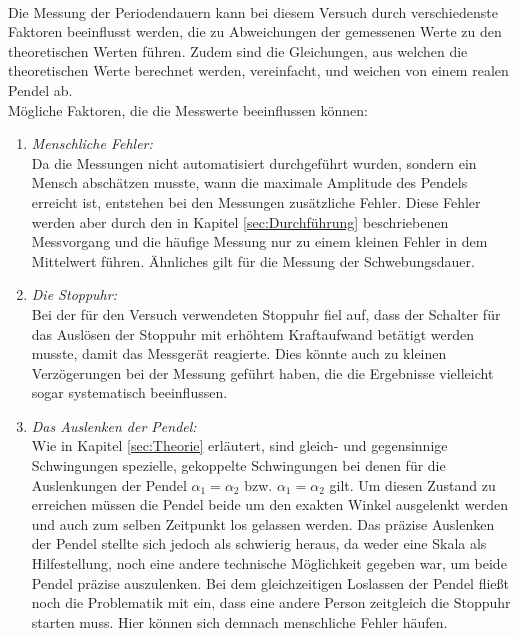         \\
Die Messung der Periodendauern kann bei diesem Versuch durch verschiedenste Faktoren beeinflusst werden, die zu Abweichungen
der gemessenen Werte zu den theoretischen Werten führen. Zudem sind die Gleichungen, aus welchen die theoretischen Werte
berechnet werden, vereinfacht, und weichen von einem realen Pendel ab.\\
Mögliche Faktoren, die die Messwerte beeinflussen können:
\begin{enumerate}
    \item \textit{Menschliche Fehler:}\\
        Da die Messungen nicht automatisiert durchgeführt wurden, sondern ein Mensch abschätzen musste, wann die maximale
        Amplitude des Pendels erreicht ist, entstehen bei den Messungen zusätzliche Fehler. Diese Fehler werden aber durch den in Kapitel
        \ref{sec:Durchführung} beschriebenen Messvorgang und die häufige Messung nur zu einem kleinen Fehler in dem Mittelwert
        führen. Ähnliches gilt für die Messung der Schwebungsdauer.
    \item \textit{Die Stoppuhr:}\\
        Bei der für den Versuch verwendeten Stoppuhr fiel auf, dass der Schalter für das Auslösen der Stoppuhr mit erhöhtem
        Kraftaufwand betätigt werden musste, damit das Messgerät reagierte. Dies könnte auch zu kleinen Verzögerungen bei der
        Messung geführt haben, die die Ergebnisse vielleicht sogar systematisch beeinflussen.
    \item \textit{Das Auslenken der Pendel:}\\
        Wie in Kapitel \ref{sec:Theorie} erläutert, sind gleich- und gegensinnige Schwingungen spezielle, gekoppelte Schwingungen bei
        denen für die Auslenkungen der Pendel $\alpha_1=\alpha_2$ bzw. $\alpha_1=\alpha_2$ gilt. Um diesen Zustand zu erreichen
        müssen die Pendel beide um den exakten Winkel ausgelenkt werden und auch zum selben Zeitpunkt los gelassen werden. Das
        präzise Auslenken der Pendel stellte sich jedoch als schwierig heraus, da weder eine Skala als Hilfestellung, noch
        eine andere technische Möglichkeit gegeben war, um beide Pendel präzise auszulenken. Bei dem gleichzeitigen Loslassen
        der Pendel fließt noch die Problematik mit ein, dass eine andere Person zeitgleich die Stoppuhr starten muss. Hier
        können sich demnach menschliche Fehler häufen.
\end{enumerate}
